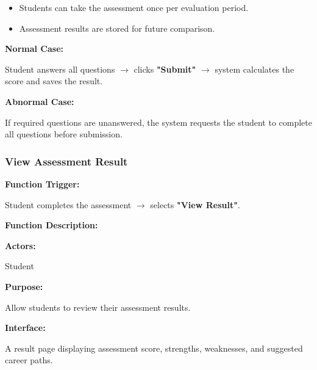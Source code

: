 \begin{itemize}
\item Students can take the assessment once per evaluation period.
\item Assessment results are stored for future comparison.
\end{itemize}

\textbf{Normal Case:}

Student answers all questions $\rightarrow$ clicks \textbf{"Submit"} $\rightarrow$ system calculates the score and saves the result.

\textbf{Abnormal Case:}

If required questions are unanswered, the system requests the student to complete all questions before submission.

%

\subsubsection{View Assessment Result}

\textbf{Function Trigger:}

Student completes the assessment $\rightarrow$ selects \textbf{"View Result"}.

\vspace{0.3cm}

\textbf{Function Description:}

\textbf{Actors:}

Student

\vspace{0.2cm}

\textbf{Purpose:}

Allow students to review their assessment results.

\vspace{0.2cm}

\textbf{Interface:}

A result page displaying assessment score, strengths, weaknesses, and suggested career paths.


